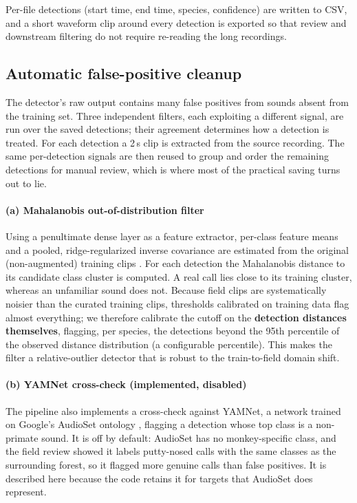 \documentclass[final,3p,times]{elsarticle}
\begin{document}
Per-file detections (start time, end time, species, confidence) are written to
CSV, and a short waveform clip around every detection is exported so that
review and downstream filtering do not require re-reading the long recordings.

\subsection*{Automatic false-positive cleanup}

The detector's raw output contains many false positives from sounds absent
from the training set. Three independent filters, each exploiting a different
signal, are run over the saved detections; their agreement determines how a
detection is treated. For each detection a 2\,s clip is extracted from the
source recording. The same per-detection signals are then reused to group and
order the remaining detections for manual review, which is where most of the
practical saving turns out to lie.

\paragraph{(a) Mahalanobis out-of-distribution filter}
Using a penultimate dense layer as a feature extractor, per-class feature means
and a pooled, ridge-regularized inverse covariance are estimated from the
original (non-augmented) training clips \cite{lee2018}. For each detection the
Mahalanobis distance to its candidate class cluster is computed. A real call
lies close to its training cluster, whereas an unfamiliar sound does not.
Because field clips are systematically noisier than the curated training clips,
thresholds calibrated on training data flag almost everything; we therefore
calibrate the cutoff on the \textbf{detection distances themselves}, flagging,
per species, the detections beyond the 95th percentile of the observed
distance distribution (a configurable percentile). This makes the filter a
relative-outlier detector that is robust to the train-to-field domain shift.

\paragraph{(b) YAMNet cross-check (implemented, disabled)}
The pipeline also implements a cross-check against YAMNet, a network trained on
Google's AudioSet ontology \cite{gemmeke2017,hershey2017}, flagging a detection
whose top class is a non-primate sound. It is off by default: AudioSet has no
monkey-specific class, and the field review showed it labels putty-nosed calls
with the same classes as the surrounding forest, so it flagged more genuine
calls than false positives. It is described here because the code retains it
for targets that AudioSet does represent.
\end{document}
